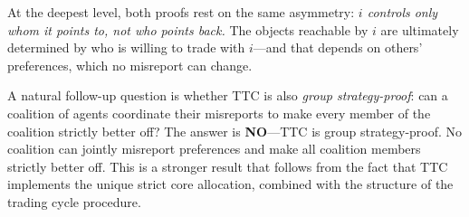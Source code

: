   At the deepest level, both proofs rest on the same asymmetry:
  \textit{$i$ controls only whom it points to, not who points back.}
  The objects reachable by $i$ are ultimately determined by who is
  willing to trade with $i$---and that depends on others' preferences,
  which no misreport can change.

A natural follow-up question is whether TTC is also
  \textit{group strategy-proof}: can a coalition of agents coordinate
  their misreports to make every member of the coalition strictly better
  off? The answer is \textbf{NO}---TTC is group strategy-proof. No
  coalition can jointly misreport preferences and make all coalition
  members strictly better off.
  This is a stronger result that follows from the fact that TTC
  implements the unique strict core allocation, combined with the
  structure of the trading cycle procedure.

